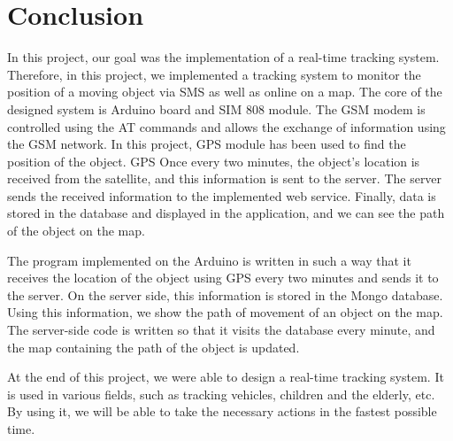 \chapter{Conclusion}
In this project, our goal was the implementation of a real-time tracking system. Therefore, in this project, we implemented a tracking system to monitor the position of a moving object via SMS as well as online on a map. The core of the designed system is Arduino board and SIM 808 module. The GSM modem is controlled using the AT commands and allows the exchange of information using the GSM network. In this project, GPS module has been used to find the position of the object. GPS Once every two minutes, the object's location is received from the satellite, and this information is sent to the server. The server sends the received information to the implemented web service. Finally, data is stored in the database and displayed in the application, and we can see the path of the object on the map.

The program implemented on the Arduino is written in such a way that it receives the location of the object using GPS every two minutes and sends it to the server. On the server side, this information is stored in the Mongo database. Using this information, we show the path of movement of an object on the map. The server-side code is written so that it visits the database every minute, and the map containing the path of the object is updated.

At the end of this project, we were able to design a real-time tracking system. It is used in various fields, such as tracking vehicles, children and the elderly, etc. By using it, we will be able to take the necessary actions in the fastest possible time.
